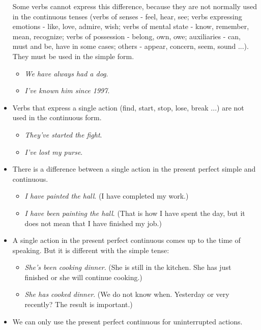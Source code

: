 \begin{itemize}
Some verbs cannot express this difference, because they are not normally used in the continuous tenses (verbs of senses - feel, hear, see; verbs expressing emotions - like, love, admire, wish; verbs of mental state - know, remember, mean, recognize; verbs of possession - belong, own, owe; auxiliaries - can, must and be, have in some cases; others - appear, concern, seem, sound ...). They must be used in the simple form. 

\begin{itemize}
\item \textit{We have always had a dog}.
\item \textit{I've known him since 1997}.
\end{itemize}

\item Verbs that express a single action (find, start, stop, lose, break ...) are not used in the continuous form. 

\begin{itemize}
\item \textit{They've started the fight}.
\item \textit{I've lost my purse}.
\end{itemize}

\item There is a difference between a single action in the present perfect simple and continuous. 

\begin{itemize}
\item \textit{I have painted the hall}. (I have completed my work.) 
\item \textit{I have been painting the hall}. (That is how I have spent the day, but it does not mean that I have finished my job.)
\end{itemize}

\item A single action in the present perfect continuous comes up to the time of speaking. But it is different with the simple tense:

\begin{itemize}
\item \textit{She's been cooking dinner}. (She is still in the kitchen. She has just finished or she will continue cooking.) 
\item \textit{She has cooked dinner}. (We do not know when. Yesterday or very recently? The result is important.)
\end{itemize}

\item We can only use the present perfect continuous for uninterrupted actions. 


\end{itemize}
